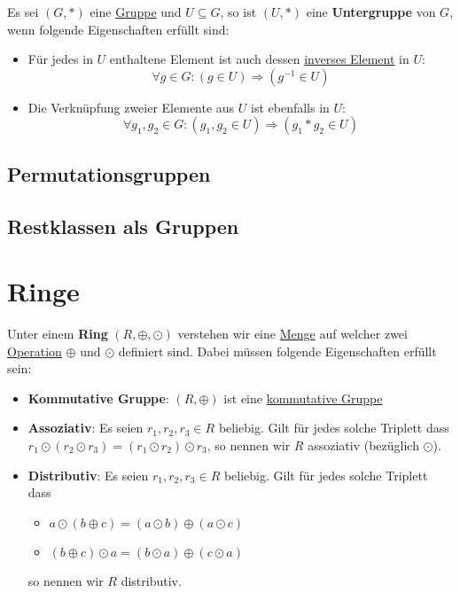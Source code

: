 \documentclass[../../main.tex]{subfiles}
\begin{document}
		\begin{definition}[Untergruppe]
			\label{def:Untergruppe}
			Es sei $(G,*)$ eine \hyperref[def:Gruppe]{Gruppe} und $U \subseteq G$, so ist $(U,*)$ eine \textbf{Untergruppe} von $G$, wenn folgende Eigenschaften erfüllt sind:  
			\begin{itemize}
				\item Für jedes in $U$ enthaltene Element ist auch dessen \hyperref[def:inversesElement]{inverses Element} in $U$: $$\forall g \in G: (g \in U) \Rightarrow (g^{-1} \in U)$$
				\item Die Verknüpfung zweier Elemente aus $U$ ist ebenfalls in $U$: $$\forall g_1,g_2 \in G: (g_1, g_2 \in U) \Rightarrow (g_1 * g_2 \in U)$$
			\end{itemize}
		\end{definition}
	
		\subsection{Permutationsgruppen}
	
		\subsection{Restklassen als Gruppen}
	
	
	
	
	
	
	
		\section{Ringe}
		\begin{definition}[Ring]
			\label{def:Ring}
			Unter einem \textbf{Ring} $(R, \oplus, \odot)$ verstehen wir eine \hyperref[def:Menge]{Menge} auf welcher zwei \hyperref[def:Operation]{Operation} $\oplus$ und $\odot$ definiert sind. Dabei müssen folgende Eigenschaften erfüllt sein: 
			\begin{itemize}
				\item \textbf{Kommutative Gruppe}: $(R, \oplus)$ ist eine \hyperref[def:kommutativeGruppe]{kommutative Gruppe}
				\item \textbf{Assoziativ}: Es seien $r_1, r_2, r_3 \in R$ beliebig. Gilt für jedes solche Triplett dass $r_1 \odot (r_2 \odot r_3) = (r_1 \odot r_2) \odot r_3$, so nennen wir $R$ assoziativ (bezüglich $\odot$). 
				\item \textbf{Distributiv}: Es seien $r_1, r_2, r_3 \in R$ beliebig. Gilt für jedes solche Triplett dass 
				\begin{itemize}
					\item $a \odot (b \oplus c) = (a \odot b) \oplus (a \odot c)$
					\item $(b \oplus c) \odot a = (b \odot a) \oplus (c \odot a)$
				\end{itemize}
				so nennen wir $R$ distributiv.
			\end{itemize}
		\end{definition}
	
\end{document}
